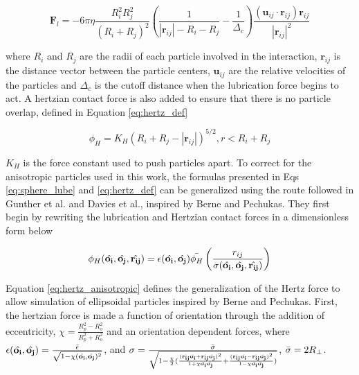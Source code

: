 \begin{equation}
    \mathbf{F}_l = -6\pi \eta \frac{R_{i}^{2} R_{j}^{2}}{(R_i + R_j)^2}(\frac{1}{|\mathbf{r}_{ij}| -R_i - R_j} -\frac{1}{\Delta_c}) \frac{(\mathbf{u}_{ij}\cdot\mathbf{r}_{ij})\mathbf{r}_{ij}}{|\mathbf{r}_{ij}|^2}
    \label{eq:sphere_lube}
\end{equation}

where $R_i$ and $R_j$ are the radii of each particle involved in the interaction, $\mathbf{r}_{ij}$ is the distance vector between the particle centers, $\mathbf{u}_{ij}$ are the relative velocities of the particles and $\Delta_c$ is the cutoff distance when the lubrication force begins to act. A hertzian contact force is also added to ensure that there is no particle overlap, defined in Equation \ref{eq:hertz_def}

\begin{equation}
    \phi_{H} = K_{H}(R_i + R_j - |\mathbf{r}_{ij}|)^{5/2}, r < R_i + R_j
    \label{eq:hertz_def}
\end{equation}

$K_H$ is the force constant used to push particles apart. To correct for the anisotropic particles used in this work, the formulas presented in Eqs \ref{eq:sphere_lube} and \ref{eq:hertz_def} can be generalized using the route followed in Gunther et al. and Davies et al., inspired by Berne and Pechukas. \cite{gunther_timescales_2014, davies_interface_2014} They first begin by rewriting the lubrication and Hertzian contact forces in a dimensionless form below

\begin{equation}
    \phi_{H}(\hat{\mathbf{o_i}}, \hat{\mathbf{o_j}}, \hat{\mathbf{r_{ij}}}) = \epsilon(\hat{\mathbf{o_i}}, \hat{\mathbf{o_j}})\Bar{\phi_{H}}\left( \frac{r_{ij}}{\sigma(\hat{\mathbf{o_i}}, \hat{\mathbf{o_j}}, \hat{\mathbf{r_{ij}}})} \right)
    \label{eq:hertz_anisotropic}
\end{equation}

Equation \ref{eq:hertz_anisotropic} defines the generalization of the Hertz force to allow simulation of ellipsoidal particles inspired by Berne and Pechukas. First, the hertzian force is made a function of orientation through the addition of eccentricity, $\chi = \frac{R_p^2 - R_o^2}{R_p^2 + R_o^2}$ and an orientation dependent forces, where $\epsilon(\hat{\mathbf{o_i}}, \hat{\mathbf{o_j}}) = \frac{\Bar{\epsilon}}{\sqrt{1 - \chi(\hat{\mathbf{o_i}}, \hat{\mathbf{o_j}})^2}}$, and $\sigma = \frac{\Bar{\sigma}}{\sqrt{1 - \frac{\chi}{2}( \frac{(\hat{\mathbf{r_{ij}}}\hat{\mathbf{o_i}} +  \hat{\mathbf{r_{ij}}}\hat{\mathbf{o_j}})^2}{1 + \chi \hat{\mathbf{o_i}}\hat{\mathbf{o_j}}} +  \frac{(\hat{\mathbf{r_{ij}}}\hat{\mathbf{o_i}} -  \hat{\mathbf{r_{ij}}}\hat{\mathbf{o_j}})^2}{1 - \chi \hat{\mathbf{o_i}}\hat{\mathbf{o_j}}})}}$, $\Bar{\sigma} = 2R_{\perp}$. \cite{gunther_lattice_2013, gunther_timescales_2014, davies_assembling_2014}

